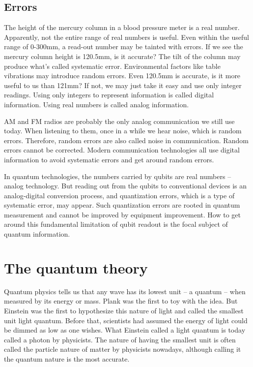 \documentclass[oneside, letter, 12pt]{book}
\begin{document}
\subsection{Errors}
The height of the mercury column in a blood pressure meter is a real number. Apparently, not the entire range of real numbers is useful. Even within the useful range of 0-300mm, a read-out number may be tainted with errors. If we see the mercury column height is 120.5mm, is it accurate? The tilt of the column may produce what's called systematic error. Environmental factors like table vibrations may introduce random errors. Even 120.5mm is accurate, is it more useful to us than 121mm? If not, we may just take it easy and use only integer readings. Using only integers to represent information is called digital information. Using real numbers is called analog information.

AM and FM radios are probably the only analog communication we still use today. When listening to them, once in a while we hear noise, which is random errors. Therefore, random errors are also called noise in communication. Random errors cannot be corrected. Modern communication technologies all use digital information to avoid systematic errors and get around random errors.

In quantum technologies, the numbers carried by qubits are real numbers -- analog technology. But reading out from the qubits to conventional devices is an analog-digital conversion process, and quantization errors, which is a type of systematic error, may appear. Such quantization errors are rooted in quantum measurement and cannot be improved by equipment improvement. How to get around this fundamental limitation of qubit readout is the focal subject of quantum information.

\section{The quantum theory}
Quantum physics tells us that any wave has its lowest unit -- a quantum --  when measured by its energy or mass. Plank was the first to toy with the idea. But Einstein was the first to hypothesize this nature of light and called the smallest unit light quantum. Before that, scientists had assumed the energy of light could be dimmed as low as one wishes. What Einstein called a light quantum is today called a photon by physicists. The nature of having the smallest unit is often called the particle nature of matter by physicists nowadays, although calling it the quantum nature is the most accurate.
\end{document}
